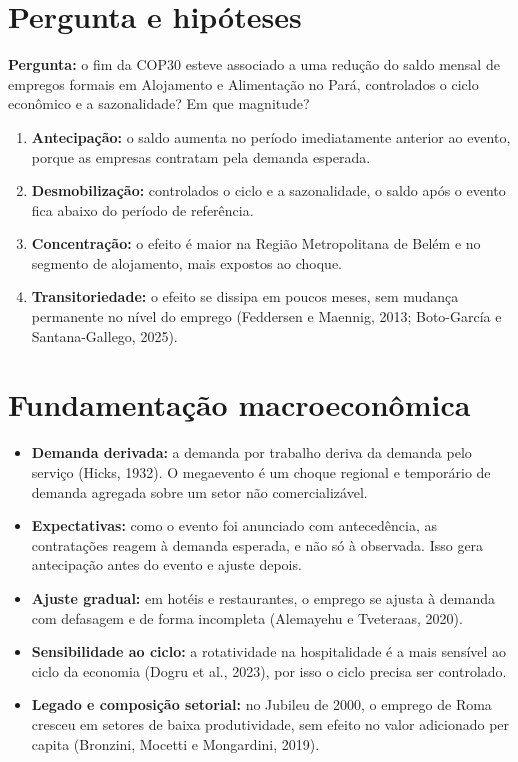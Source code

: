 \documentclass[11pt,a4paper]{article}
\begin{document}
\section{Pergunta e hipóteses}

\textbf{Pergunta:} o fim da COP30 esteve associado a uma redução do saldo mensal de empregos formais
em Alojamento e Alimentação no Pará, controlados o ciclo econômico e a sazonalidade? Em que magnitude?

\begin{enumerate}[label=\textbf{H\arabic*.}, leftmargin=*]
  \item \textbf{Antecipação:} o saldo aumenta no período imediatamente anterior ao evento, porque as
        empresas contratam pela demanda esperada.
  \item \textbf{Desmobilização:} controlados o ciclo e a sazonalidade, o saldo após o evento fica abaixo
        do período de referência.
  \item \textbf{Concentração:} o efeito é maior na Região Metropolitana de Belém e no segmento de
        alojamento, mais expostos ao choque.
  \item \textbf{Transitoriedade:} o efeito se dissipa em poucos meses, sem mudança permanente no nível do
        emprego (Feddersen e Maennig, 2013; Boto-García e Santana-Gallego, 2025).
\end{enumerate}

\section{Fundamentação macroeconômica}

\begin{itemize}
  \item \textbf{Demanda derivada:} a demanda por trabalho deriva da demanda pelo serviço (Hicks, 1932).
        O megaevento é um choque regional e temporário de demanda agregada sobre um setor não
        comercializável.
  \item \textbf{Expectativas:} como o evento foi anunciado com antecedência, as contratações reagem à
        demanda esperada, e não só à observada. Isso gera antecipação antes do evento e ajuste depois.
  \item \textbf{Ajuste gradual:} em hotéis e restaurantes, o emprego se ajusta à demanda com defasagem e
        de forma incompleta (Alemayehu e Tveteraas, 2020).
  \item \textbf{Sensibilidade ao ciclo:} a rotatividade na hospitalidade é a mais sensível ao ciclo da
        economia (Dogru et al., 2023), por isso o ciclo precisa ser controlado.
  \item \textbf{Legado e composição setorial:} no Jubileu de 2000, o emprego de Roma cresceu em setores
        de baixa produtividade, sem efeito no valor adicionado per capita (Bronzini, Mocetti e
        Mongardini, 2019).
\end{itemize}
\end{document}
